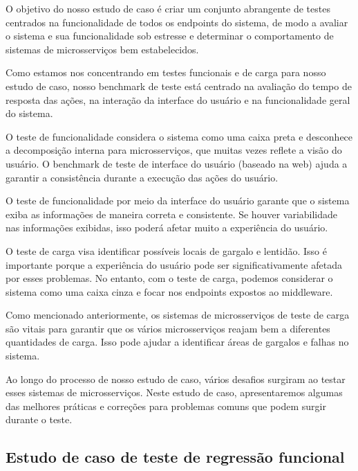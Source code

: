 O objetivo do nosso estudo de caso é criar um conjunto abrangente de testes centrados na funcionalidade de todos os endpoints do sistema, de modo a avaliar o sistema e sua funcionalidade sob estresse e determinar o comportamento de sistemas de microsserviços bem estabelecidos.


Como estamos nos concentrando em testes funcionais e de carga para nosso estudo de caso, nosso benchmark de teste está centrado na avaliação do tempo de resposta das ações, na interação da interface do usuário e na funcionalidade geral do sistema.

O teste de funcionalidade considera o sistema como uma caixa preta e desconhece a decomposição interna para microsserviços, que muitas vezes reflete a visão do usuário. O benchmark de teste de interface do usuário (baseado na web) ajuda a garantir a consistência durante a execução das ações do usuário.

O teste de funcionalidade por meio da interface do usuário garante que o sistema exiba as informações de maneira correta e consistente. Se houver variabilidade nas informações exibidas, isso poderá afetar muito a experiência do usuário.

O teste de carga visa identificar possíveis locais de gargalo e lentidão. Isso é importante porque a experiência do usuário pode ser significativamente afetada por esses problemas. No entanto, com o teste de carga, podemos considerar o sistema como uma caixa cinza e focar nos endpoints expostos ao middleware.



Como mencionado anteriormente, os sistemas de microsserviços de teste de carga são vitais para garantir que os vários microsserviços reajam bem a diferentes quantidades de carga. Isso pode ajudar a identificar áreas de gargalos e falhas no sistema.


Ao longo do processo de nosso estudo de caso, vários desafios surgiram ao testar esses sistemas de microsserviços. Neste estudo de caso, apresentaremos algumas das melhores práticas e correções para problemas comuns que podem surgir durante o teste.

\subsection{Estudo de caso de teste de regressão funcional}

